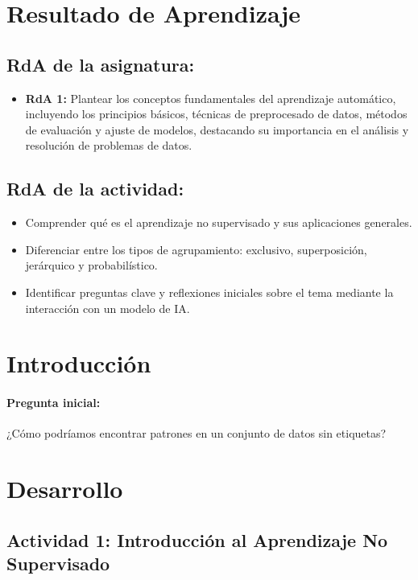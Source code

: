\documentclass[a4,11pt]{aleph-notas}
\begin{document}
\encabezado


\section*{Resultado de Aprendizaje}

\subsection*{RdA de la asignatura:}
\begin{itemize}[leftmargin=*]
    \item \textbf{RdA 1:} 
    Plantear los conceptos fundamentales del aprendizaje automático, incluyendo los principios básicos, técnicas de preprocesado de datos, métodos de evaluación y ajuste de modelos, destacando su importancia en el análisis y resolución de problemas de datos.
\end{itemize}

\subsection*{RdA de la actividad:}
    \begin{itemize}[leftmargin=*]
        \item Comprender qué es el aprendizaje no supervisado y sus aplicaciones generales.
        \item Diferenciar entre los tipos de agrupamiento: exclusivo, superposición, jerárquico y probabilístico.
        \item Identificar preguntas clave y reflexiones iniciales sobre el tema mediante la interacción con un modelo de IA.
    \end{itemize}

\section*{Introducción}

\paragraph{Pregunta inicial:} 
¿Cómo podríamos encontrar patrones en un conjunto de datos sin etiquetas?

\section*{Desarrollo}

\subsection*{Actividad 1: Introducción al Aprendizaje No Supervisado}
\end{document}
